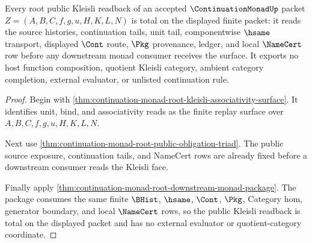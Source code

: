 \begin{theorem}
\label{thm:continuation-monad-root-public-kleisli-readback}
Every root public Kleisli readback of an accepted $\ContinuationMonadUp$
packet $Z=(A,B,C,f,g,u,H,K,L,N)$ is total on the displayed finite packet: it
reads the source histories, continuation tails, unit tail, componentwise
$\hsame$ transport, displayed $\Cont$ route, $\Pkg$ provenance, ledger, and
local $\NameCert$ row before any downstream monad consumer receives the
surface. It exports no host function composition, quotient Kleisli category,
ambient category completion, external evaluator, or unlisted continuation
rule.
\end{theorem}
\begin{proof}
Begin with
\autoref{thm:continuation-monad-root-kleisli-associativity-surface}. It
identifies unit, bind, and associativity reads as the finite replay surface
over $A,B,C,f,g,u,H,K,L,N$.

Next use \autoref{thm:continuation-monad-root-public-obligation-triad}. The
public source exposure, continuation tails, and NameCert rows are already
fixed before a downstream consumer reads the Kleisli face.

Finally apply \autoref{thm:continuation-monad-root-downstream-monad-package}.
The package consumes the same finite $\BHist$, $\hsame$, $\Cont$, $\Pkg$,
Category hom, generator boundary, and local $\NameCert$ rows, so the public
Kleisli readback is total on the displayed packet and has no external
evaluator or quotient-category coordinate.
\end{proof}

